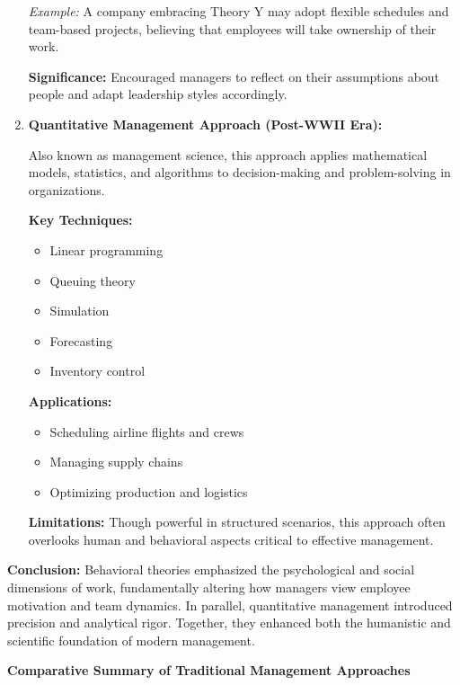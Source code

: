 \documentclass[10pt,a4paper]{book}
\begin{document}
\begin{multicols}{2}
\begin{enumerate}
    \textit{Example:} A company embracing Theory Y may adopt flexible schedules and team-based projects, believing that employees will take ownership of their work.

    \textbf{Significance:} Encouraged managers to reflect on their assumptions about people and adapt leadership styles accordingly.

    \item \textbf{Quantitative Management Approach (Post-WWII Era):}

    Also known as management science, this approach applies mathematical models, statistics, and algorithms to decision-making and problem-solving in organizations.

    \textbf{Key Techniques:}
    \begin{itemize}
        \item Linear programming
        \item Queuing theory
        \item Simulation
        \item Forecasting
        \item Inventory control
    \end{itemize}

    \textbf{Applications:}
    \begin{itemize}
        \item Scheduling airline flights and crews
        \item Managing supply chains
        \item Optimizing production and logistics
    \end{itemize}

    \textbf{Limitations:} Though powerful in structured scenarios, this approach often overlooks human and behavioral aspects critical to effective management.

\end{enumerate}

\textbf{Conclusion:} Behavioral theories emphasized the psychological and social dimensions of work, fundamentally altering how managers view employee motivation and team dynamics. In parallel, quantitative management introduced precision and analytical rigor. Together, they enhanced both the humanistic and scientific foundation of modern management.

\end{multicols}


\textbf{Comparative Summary of Traditional Management Approaches}
\end{document}
